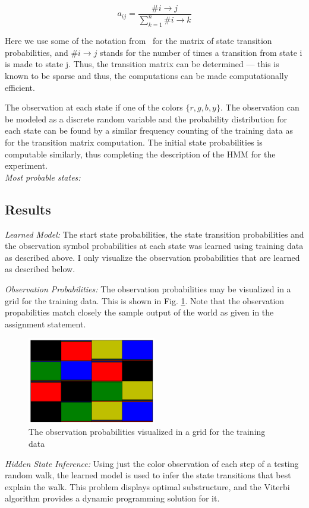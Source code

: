 \documentclass[5pt]{article}
\begin{document}
\begin{equation}
a_{ij} = \frac{\#i \rightarrow j}{\sum_{k=1}^{n}\#i \rightarrow k}
\end{equation}

Here we use some of the notation from~\cite{rabiner1989tutorial} for the matrix
of state transition probabilities, and $\#i \rightarrow j$ stands for the
number of times a transition from state i is made to state j. Thus, the
transition matrix can be determined --- this is known to be sparse and thus,
the computations can be made computationally efficient.

The observation at each state if one of the colors $\{r, g, b, y\}$. The
observation can be modeled as a discrete random variable and the probability
distribution for each state can be found by a similar frequency counting of the
training data as for the transition matrix computation. The initial state
probabilities is computable similarly, thus completing the description of the
HMM for the experiment. \\

\noindent \emph{Most probable states:}

\subsection{Results}

\noindent \emph{Learned Model:} The start state probabilities, the state
transition probabilities and the observation symbol probabilities at each state
was learned using training data as described above. I only visualize the
observation probabilities that are learned as described below.

\noindent \emph{Observation Probabilities:} The observation probabilities may
be visualized in a grid for the training data. This is shown in Fig.
\ref{fig:observationP}. Note that the observation propabilities match closely
the sample output of the world as given in the assignment statement.

\begin{figure}[h]
  \center{}
  \includegraphics[width=0.5\textwidth]{images/observationP.png}
\caption{The observation probabilities visualized in a grid for the training
data}
\label{fig:observationP}
\end{figure}

\noindent \emph{Hidden State Inference:} Using just the color observation of
each step of a testing random walk, the learned model is used to infer the
state transitions that best explain the walk. This problem displays optimal
substructure, and the Viterbi algorithm provides a dynamic programming solution
for it.

\medskip


\end{document}
